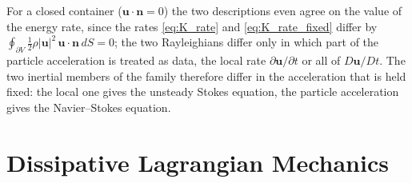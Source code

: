 \documentclass[aip,pof,reprint,amsmath,amssymb,longbibliography]{revtex4-2}
\begin{document}
For a closed container ($\boldsymbol{u} \cdot \boldsymbol{n} = 0$) the two descriptions even agree on the value of the energy rate, since the rates \eqref{eq:K_rate} and \eqref{eq:K_rate_fixed} differ by $\oint_{\partial V} \tfrac{1}{2}\rho|\boldsymbol{u}|^2\, \boldsymbol{u}\cdot\boldsymbol{n}\, dS = 0$; the two Rayleighians differ only in which part of the particle acceleration is treated as data, the local rate $\partial\boldsymbol{u}/\partial t$ or all of $D\boldsymbol{u}/Dt$. The two inertial members of the family therefore differ in the acceleration that is held fixed: the local one gives the unsteady Stokes equation, the particle acceleration gives the Navier--Stokes equation.


\section{Dissipative Lagrangian Mechanics}
\label{sec:lagrangian}
\end{document}
